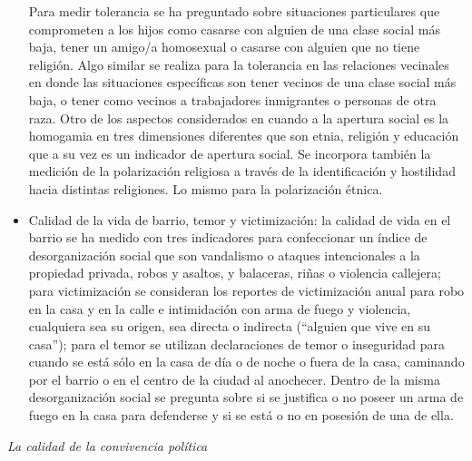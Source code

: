 \documentclass[
  12pt,
]{book}
\begin{document}
\begin{itemize}
  Para medir tolerancia se ha preguntado sobre situaciones
  particulares que comprometen a los hijos como casarse con alguien de
  una clase social más baja, tener un amigo/a homosexual o casarse con
  alguien que no tiene religión. Algo similar se realiza para la
  tolerancia en las relaciones vecinales en donde las situaciones
  específicas son tener vecinos de una clase social más baja, o tener
  como vecinos a trabajadores inmigrantes o personas de otra raza.
  Otro de los aspectos considerados en cuando a la apertura social es
  la homogamia en tres dimensiones diferentes que son etnia, religión
  y educación que a su vez es un indicador de apertura social. Se
  incorpora también la medición de la polarización religiosa a través
  de la identificación y hostilidad hacia distintas religiones. Lo
  mismo para la polarización étnica.
\item
  Calidad de la vida de barrio, temor y victimización: la calidad de
  vida en el barrio se ha medido con tres indicadores para
  confeccionar un índice de desorganización social que son vandalismo
  o ataques intencionales a la propiedad privada, robos y asaltos, y
  balaceras, riñas o violencia callejera; para victimización se
  consideran los reportes de victimización anual para robo en la casa
  y en la calle e intimidación con arma de fuego y violencia,
  cualquiera sea su origen, sea directa o indirecta (``alguien que vive
  en su casa''); para el temor se utilizan declaraciones de temor o
  inseguridad para cuando se está sólo en la casa de día o de noche o
  fuera de la casa, caminando por el barrio o en el centro de la
  ciudad al anochecer. Dentro de la misma desorganización social se
  pregunta sobre si se justifica o no poseer un arma de fuego en la
  casa para defenderse y si se está o no en posesión de una de ella.
\end{itemize}

\emph{La calidad de la convivencia política}
\end{document}
